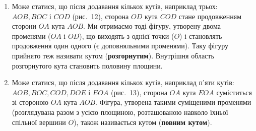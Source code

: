 \begin{enumerate}
    \item Може статися, що після додавання кількох кутів, наприклад трьох: $AOB, BOC$ і $COD$ (рис.~12), сторона $OD$ кута $COD$ стане продовженням сторони $OA$ кута $AOB$. Ми отримаємо тоді фігуру, утворену двома променями ($OA$ і $OD$), що виходять з однієї точки ($O$) і становлять продовження один одного (є доповняльними променями). Таку фігуру прийнято теж називати кутом (\textbf{розгорнутим}). Внутрішня область розгорнутого кута становить половину площини.
    
    \begin{center}
    \end{center}

    \item Може статися, що після додавання кількох кутів, наприклад п'яти кутів: $AOB,\allowbreak BOC,\allowbreak COD,\allowbreak DOE$ і $EOA$ (рис.~13), сторона $OA$ кута $EOA$ суміститься зі стороною $OA$ кута $AOB$. Фігура, утворена такими суміщеними променями (розглядувана разом з усією площиною, розташованою навколо їхньої спільної вершини $O$), також називається кутом (\textbf{повним кутом}).
    
    \begin{center}
\end{center}
\end{enumerate}
